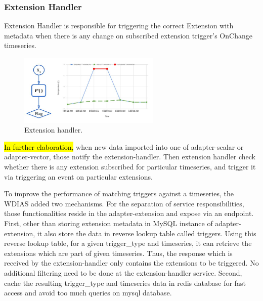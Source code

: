 \subsubsection{Extension Handler}
Extension Handler is responsible for triggering the correct Extension with metadata when there is any change on subscribed extension trigger's OnChange timeseries.
\begin{figure}[htp]
    \centering
    \includegraphics[width=0.6\textwidth]{method/data_preprocess/validation.jpg}
    \caption{Extension handler.}
    \label{fi:extension_handler}
\end{figure}

\hl{In further elaboration,} when new data imported into one of adapter-scalar or adapter-vector, those notify the extension-handler. Then extension handler check whether there is any extension subscribed for particular timeseries, and trigger it via triggering an event on particular extensions.

To improve the performance of matching triggers against a timeseries, the WDIAS added two mechanisms. For the separation of service responsibilities, those functionalities reside in the adapter-extension and expose via an endpoint. First, other than storing extension metadata in MySQL instance of adapter-extension, it also store the data in reverse lookup table called triggers. Using this reverse lookup table, for a given trigger\_type and timeseries, it can retrieve the extensions which are part of given timeseries. Thus, the response which is received by the 
extension-handler only contains the extensions to be triggered. No additional filtering need to be done at the extension-handler service.
Second, cache the resulting trigger\_type and timeseries data in \acrshort{redis} database for fast access and avoid too much queries on \acrshort{mysql} database.


